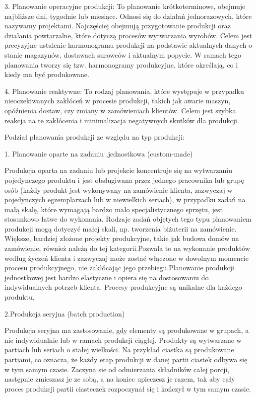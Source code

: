     3. Planowanie operacyjne produkcji: To planowanie krótkoterminowe, obejmuje najbliższe dni, tygodnie lub miesiące. Odnosi się do działań jednorazowych, które nazywamy projektami. Najczęściej obejmują przygotowanie produkcji oraz działania powtarzalne, które dotyczą procesów wytwarzania wyrobów. Celem jest precyzyjne ustalenie harmonogramu produkcji na podstawie aktualnych danych o stanie magazynów, dostawach surowców i aktualnym popycie. W ramach tego planowania tworzy się tzw. harmonogramy produkcyjne, które określają, co i kiedy ma być produkowane.
    
    4. Planowanie reaktywne: To rodzaj planowania, które występuje w przypadku nieoczekiwanych zakłóceń w procesie produkcji, takich jak awarie maszyn, opóźnienia dostaw, czy zmiany w zamówieniach klientów. Celem jest szybka reakcja na te zakłócenia i minimalizacja negatywnych skutków dla produkcji.

    Podział planowania produkcji ze względu na typ produkcji:

    1. Planowanie oparte na zadaniu ,jednostkowa (custom-made)

Produkcja oparta na zadaniu lub projekcie koncentruje się na wytwarzaniu pojedynczego produktu i jest obsługiwana przez jednego pracownika lub grupę osób (każdy produkt jest wykonywany na zamówienie klienta, zazwyczaj w pojedynczych egzemplarzach lub w niewielkich seriach), w przypadku zadań na małą skalę, które wymagają bardzo mało specjalistycznego sprzętu, jest stosunkowo łatwe do wykonania. Rodzaje zadań objętych tego typu planowaniem produkcji mogą dotyczyć małej skali, np. tworzenia biżuterii na zamówienie. Większe, bardziej złożone projekty produkcyjne, takie jak budowa domów na zamówienie, również należą do tej kategorii.Pozwala to na wykonanie produktów według życzeń klienta i zazwyczaj może zostać włączone w dowolnym momencie procesu produkcyjnego, nie zakłócając jego przebiegu.Planowanie produkcji jednostkowej jest bardzo elastyczne i opiera się na dostosowaniu do indywidualnych potrzeb klienta. Procesy produkcyjne są unikalne dla każdego produktu.


2.Produkcja seryjna (batch production)

Produkcja seryjna ma zastosowanie, gdy elementy są produkowane w grupach, a nie indywidualnie lub w ramach produkcji ciągłej. Produkty są wytwarzane w partiach lub seriach o stałej wielkości. Na przykład ciastka są produkowane partiami, co oznacza, że każdy etap produkcji w danej partii ciastek odbywa się w tym samym czasie. Zaczyna sie od odmierzania składników całej porcji, następnie zmieszasz je ze sobą, a na koniec upieczesz je razem, tak aby cały proces produkcji partii ciasteczek rozpoczynał się i kończył w tym samym czasie.


